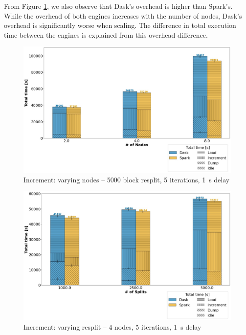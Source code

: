 \documentclass[conference]{IEEEtran}
\begin{document}
From Figure \ref{fig:increment_worker}, we also observe that Dask's overhead is higher than Spark's.
While the overhead of both engines increases with the number of nodes, Dask's overhead is significantly worse when scaling.
The difference in total execution time between the engines is explained from this overhead difference.
\begin{figure}[!h]
	\centering
	\includegraphics[clip,width=\columnwidth]{figures/stacked_increment_worker.jpg}
	\caption{Increment: varying nodes -- 5000 block resplit, 5 iterations, \SI{1}{\second} delay}
	\label{fig:increment_worker}
\end{figure}


\begin{figure}[!h]
	\centering
	\includegraphics[clip,width=\columnwidth]{figures/stacked_increment_block.jpg}
	\caption{Increment: varying resplit -- 4 nodes, 5 iterations, \SI{1}{\second} delay}
	\label{fig:increment_block}
\end{figure}
\end{document}

